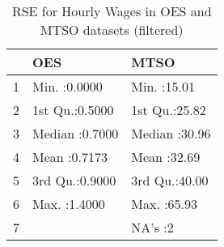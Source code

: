\begin{table}[ht]
\centering
\begin{tabular}{rll}
  \hline
 &      OES &      MTSO \\ 
  \hline
1 & Min.   :0.0000   & Min.   :15.01   \\ 
  2 & 1st Qu.:0.5000   & 1st Qu.:25.82   \\ 
  3 & Median :0.7000   & Median :30.96   \\ 
  4 & Mean   :0.7173   & Mean   :32.69   \\ 
  5 & 3rd Qu.:0.9000   & 3rd Qu.:40.00   \\ 
  6 & Max.   :1.4000   & Max.   :65.93   \\ 
  7 &  & NA's   :2   \\ 
   \hline
\end{tabular}
\caption{RSE for Hourly Wages in OES and MTSO datasets (filtered)} 
\label{tab:rse_oes_mtso2}
\end{table}
